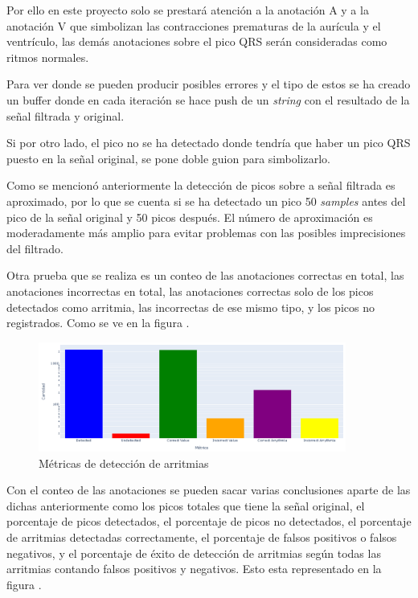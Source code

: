 Por ello en este proyecto solo se prestará atención a la anotación A y a la anotación V que simbolizan 
las contracciones prematuras de la aurícula y el ventrículo, las demás anotaciones sobre el pico QRS serán 
consideradas como ritmos normales.

Para ver donde se pueden producir posibles errores y el tipo de estos se ha creado un buffer donde en 
cada iteración se hace push de un \textit{string} con el resultado de la señal filtrada y original.

Si por otro lado, el pico no se ha detectado donde tendría que haber un pico QRS puesto en la señal original, 
se pone doble guion para simbolizarlo.

Como se mencionó anteriormente la detección de picos sobre a señal filtrada es aproximado, por lo que se cuenta
si se ha detectado un pico 50 \textit{samples} antes del pico de la señal original y 50 picos después. El número de aproximación 
es moderadamente más amplio para evitar problemas con las posibles imprecisiones del filtrado.  

Otra prueba que se realiza es un conteo de las anotaciones correctas en total, las anotaciones incorrectas en total, las anotaciones
correctas solo de los picos detectados como arritmia, las incorrectas de ese mismo tipo, y los picos no registrados. 
Como se ve en la figura .

\begin{figure}[h!]
	\centering
    \includegraphics[width=0.9\textwidth]{./Images/img_algoritmo/estadisticas_arritmias_1.png}
    \caption{Métricas de detección de arritmias}
    \label{fig:estadisticas_algoritmos_1}
\end{figure} 

Con el conteo de las anotaciones se pueden sacar varias conclusiones aparte de las dichas 
anteriormente como los picos totales que tiene la señal original, el porcentaje de picos 
detectados, el porcentaje de picos no detectados, el porcentaje de arritmias detectadas 
correctamente, el porcentaje de falsos positivos o falsos negativos, y el porcentaje de éxito de detección de 
arritmias según todas las arritmias contando falsos positivos y negativos. Esto esta representado en la figura .


